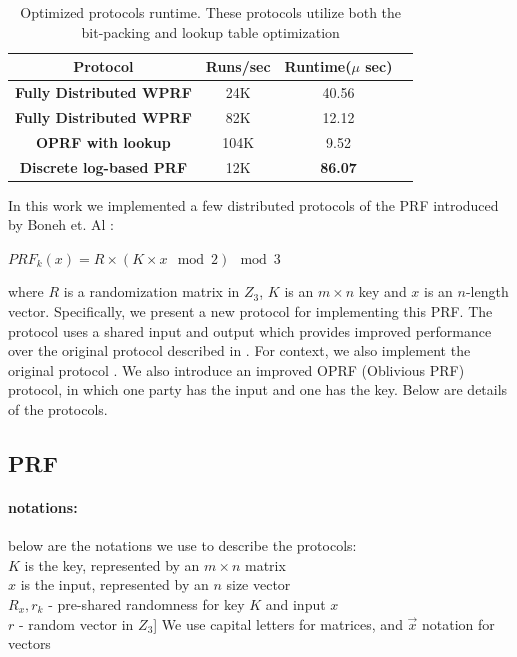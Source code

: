 \begin{table}[htbp]
	\begin{center}
		\begin{tabular}{|c|c|c|c|}
			\hline
			\textbf{Protocol} & \textbf{Runs/sec} & \textbf{Runtime($\mu$ sec)} \\
			\hline
			\hline
			\textbf{Fully Distributed WPRF\cite{darkmatter}} & 24K & 40.56  \\
			\hline
			\textbf{Fully Distributed WPRF} &  82K &  12.12\\
			\hline
			\textbf{OPRF with lookup} &  104K &  9.52 \\
			\hline
			\textbf{Discrete log-based PRF } & 12K &\textbf{86.07}\\
			\hline
			
		\end{tabular}
		
		\vspace{-1mm}
		\caption{Optimized protocols runtime. These protocols utilize both the bit-packing and lookup table optimization}
		\label{RuntimeTable}
	\end{center}
	\vspace{-5mm}
\end{table}


\iffalse

In this work we implemented a few distributed protocols of the PRF introduced by Boneh et. Al  \cite{darkmatter}:

$PRF_k(x) = R \times (K \times x \mod 2)  \mod 3 $

where $R$ is a randomization matrix in $Z_3$, $K$ is an $m \times n$ key and $x$ is an $n$-length vector. Specifically, we present a new protocol for implementing this PRF. The protocol uses a shared input and output which provides improved performance over the original protocol described in \cite{darkmatter}. For context, we also implement the original protocol \cite{darkmatter} . We also introduce an improved OPRF (Oblivious PRF) protocol, in which one party has the input and one has the key. Below are  details of the protocols.

\subsection{PRF}


\paragraph{notations:} below are the notations we use to describe the protocols: \\
$K$ is the key, represented by an $m \times n$ matrix \\
$x$ is the input, represented by an $n$ size vector \\
$R_x, r_k$ - pre-shared randomness for key $K$ and input $x$ \\
$r$ - random vector in $Z_3$]
We use capital letters for matrices, and $\vec{x}$ notation for vectors \\

